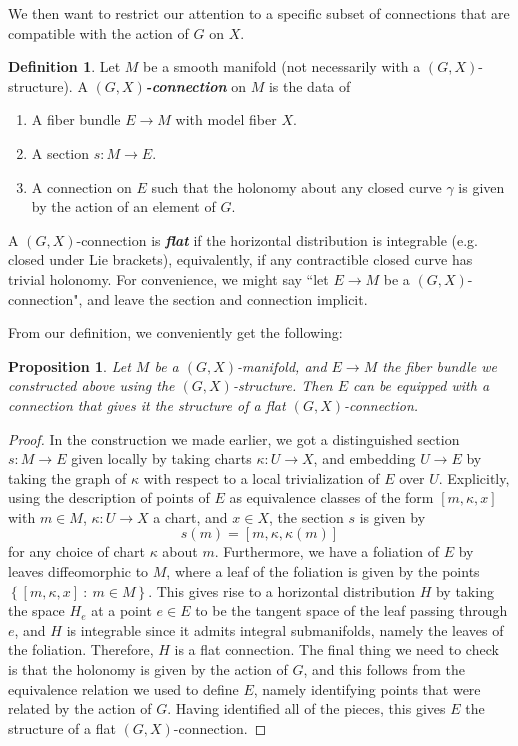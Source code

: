 \documentclass[psamsfonts, 12pt]{amsart}
\newtheorem{prop}[thm]{Proposition}
\theoremstyle{definition}
\newtheorem{defn}[thm]{Definition}
\theoremstyle{remark}
\newcommand{\ib}[1]{\textbf{\textit{#1}}}
\newcommand{\set}[1]{\left\lbrace #1 \right\rbrace}
\begin{document}
We then want to restrict our attention to a specific subset of connections
that are compatible with the action of $G$ on $X$.
%
\begin{defn}
Let $M$ be a smooth manifold (not necessarily with a $(G,X)$-structure).
A \ib{$(G,X)$-connection} on $M$ is the data of
\begin{enumerate}
  \item A fiber bundle $E \to M$ with model fiber $X$.
  \item A section $s : M \to E$.
  \item A connection on $E$ such that the holonomy about any closed curve
  $\gamma$ is given by the action of an element of $G$.
\end{enumerate}
A $(G,X)$-connection is \ib{flat} if the horizontal distribution is
integrable (e.g. closed under Lie brackets), equivalently, if any contractible
closed curve has trivial holonomy. For convenience, we might say ``let $E \to M$
be a $(G,X)$-connection", and leave the section and connection implicit.
\end{defn}
%
From our definition, we conveniently get the following:
%
\begin{prop}
Let $M$ be a $(G,X)$-manifold, and $E \to M$ the fiber bundle we constructed
above using the $(G,X)$-structure. Then $E$ can be equipped with a connection
that gives it the structure of a flat $(G,X)$-connection.
\end{prop}
%
\begin{proof}
In the construction we made earlier, we got a distinguished section
$s : M \to E$ given locally by taking charts $\kappa : U \to X$, and
embedding $U \to E$ by taking the graph of $\kappa$ with respect to a local
trivialization of $E$ over $U$. Explicitly, using the description of points
of $E$ as equivalence classes of the form $[m,\kappa, x]$ with $m \in M$,
$\kappa : U \to X$ a chart, and $x \in X$, the section $s$ is given by
\[
s(m) = [m,\kappa, \kappa(m)]
\]
for any choice of chart $\kappa$ about $m$. Furthermore, we have a foliation
of $E$ by leaves diffeomorphic to $M$, where a leaf of the foliation is
given by the points $\set{[m,\kappa,x] ~:~ m \in M}$. This gives rise to
a horizontal distribution $H$ by taking the space $H_e$ at a point $e \in E$
to be the tangent space of the leaf passing through $e$, and $H$ is integrable
since it admits integral submanifolds, namely the leaves of the foliation. Therefore,
$H$ is a flat connection. The final thing we need to check is that the holonomy
is given by the action of $G$, and this follows from the equivalence relation
we used to define $E$, namely identifying points that were related by the action of $G$.
Having identified all of the pieces, this gives $E$ the structure of a
flat $(G,X)$-connection.
\end{proof}
\end{document}
